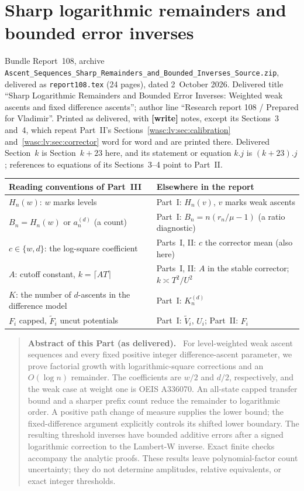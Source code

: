 \documentclass[11pt,a4paper]{article}
\newcommand{\file}[1]{\nolinkurl{#1}}
\theoremstyle{remark}\newtheorem{remark}[theorem]{Remark}
\numberwithin{equation}{section}
\newenvironment{partabstract}{\begin{quote}\small\noindent\textbf{Abstract of this Part (as delivered).}\ }{\end{quote}}
\newcommand{\partsource}[1]{\par\noindent\begin{minipage}{\textwidth}\small #1\end{minipage}\par\medskip}
\begin{document}
\clearpage
\part{Sharp logarithmic remainders and bounded error inverses}\label{wasc:sh:part}
\partsource{Bundle Report~108, archive \file{Ascent_Sequences_Sharp_Remainders_and_Bounded_Inverses_Source.zip}, delivered as \file{report108.tex} (24 pages), dated 2~October 2026. Delivered title ``Sharp Logarithmic Remainders and Bounded Error Inverses: Weighted weak ascents and fixed difference ascents''; author line ``Research report 108 / Prepared for Vladimir''. Printed as delivered, with \textbf{[write]} notes, except its Sections~3 and~4, which repeat Part~II's Sections~\ref{wasc:lv:sec:calibration} and~\ref{wasc:lv:sec:corrector} word for word and are printed there. Delivered Section~$k$ is Section~$k+23$ here, and its statement or equation $k.j$ is $(k+23).j$; references to equations of its Sections~3--4 point to Part~II.}
\begin{center}
\small
\begin{tabular}{@{}>{\raggedright\arraybackslash}p{} >{\raggedright\arraybackslash}p{}@{}}
\toprule
Reading conventions of Part~III & Elsewhere in the report\\
\midrule
$H_n(w)$: $w$ marks levels & Part~I: $H_n(v)$, $v$ marks weak ascents\\
$B_n=H_n(w)$ or $a_n^{(d)}$ (a count) & Part~I: $B_n=n(r_n/\mu-1)$ (a ratio diagnostic)\\
$c\in\{w,d\}$: the log-square coefficient & Parts~I, II: $c$ the corrector mean (also here)\\
$A$: cutoff constant, $k=\lceil AT\rceil$ & Parts~I, II: $A$ in the stable corrector; $k\asymp T^2/U^2$\\
$K$: the number of $d$-ascents in the difference model & Part~I: $K^{(d)}_n$\\
$F_i$ capped, $\widetilde F_i$ uncut potentials & Part~I: $\widetilde V_i$, $U_i$; Part~II: $F_i$\\
\bottomrule
\end{tabular}
\end{center}
\begin{partabstract}
For level-weighted weak ascent sequences and every fixed positive integer difference-ascent parameter, we prove factorial growth with logarithmic-square corrections and an $O(\log n)$ remainder. The coefficients are $w/2$ and $d/2$, respectively, and the weak case at weight one is OEIS A336070. An all-state capped transfer bound and a sharper prefix count reduce the remainder to logarithmic order. A positive path change of measure supplies the lower bound; the fixed-difference argument explicitly controls its shifted lower boundary. The resulting threshold inverses have bounded additive errors after a signed logarithmic correction to the Lambert-W inverse. Exact finite checks accompany the analytic proofs. These results leave polynomial-factor count uncertainty; they do not determine amplitudes, relative equivalents, or exact integer thresholds.
\end{partabstract}
\end{document}
